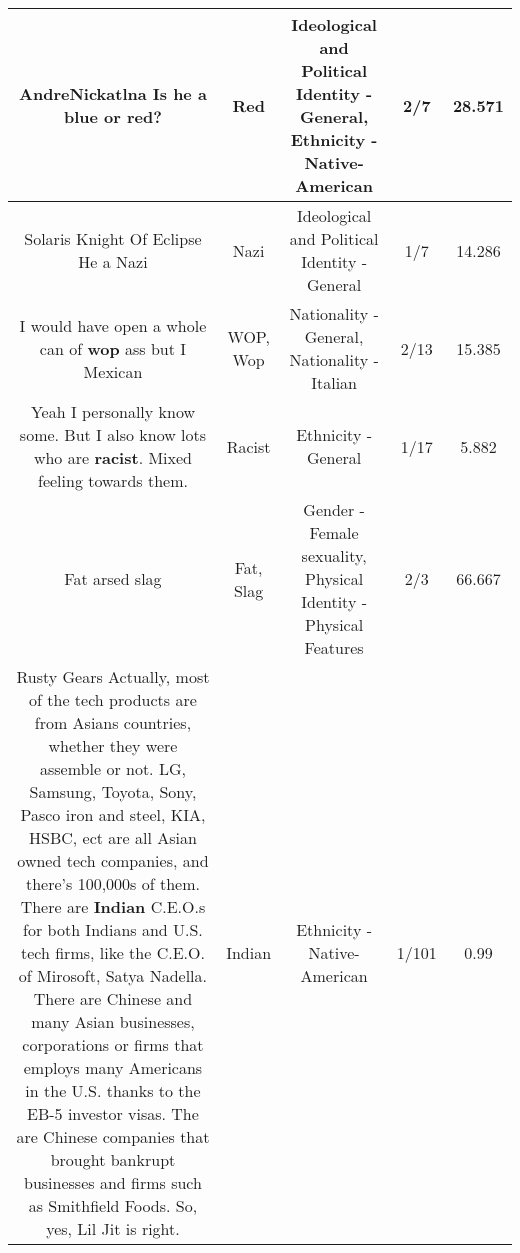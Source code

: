 \documentclass[11pt]{article}
\newlength\mylength
\begin{document}
\begin{center}
\begin{longtable}{|C{.65\mylength}|C{.30\mylength}|C{.12\mylength}|C{.12\mylength}|C{.12\mylength}|}
  \small AndreNickatlna Is he a blue or \textbf{r\textbf{ed}}?\normalsize   & Red &  Ideological and Political Identity - General, Ethnicity - Native-American & 2/7 & 28.571 \\  \hline
  \small Solaris Knight Of Eclipse He a Nazi\normalsize   & Nazi &  Ideological and Political Identity - General & 1/7 & 14.286 \\  \hline
  \small I would have open a whole can of \textbf{w\textbf{op}} ass but I Mexican\normalsize   & WOP, Wop & Nationality - General, Nationality - Italian & 2/13 & 15.385 \\  \hline
  \small Yeah I personally know some. But I also know lots who are \textbf{racist}. Mixed feeling towards them.\normalsize   & Racist & Ethnicity - General & 1/17 & 5.882 \\  \hline
  \small Fat arsed slag\normalsize   & Fat, Slag & Gender - Female sexuality, Physical Identity - Physical Features & 2/3 & 66.667 \\  \hline
  \small Rusty Gears Actually, most of the tech products are from Asians countries, whether they were assemble or not. LG, Samsung, Toyota, Sony, Pasco iron and steel, KIA, HSBC, ect are all Asian owned tech companies, and there's 100,000s of them. There are \textbf{Indian} C.E.O.s for both Indians and U.S. tech firms, like the C.E.O. of Mirosoft, Satya Nadella. There are Chinese and many Asian businesses, corporations or firms that employs many Americans in the U.S. thanks to the EB-5 investor visas. The are Chinese companies that brought bankrupt businesses and firms such as Smithfield Foods. So, yes, Lil Jit is right.\normalsize   & Indian & Ethnicity - Native-American & 1/101 & 0.99 \\  \hline

\end{longtable}
\end{center}
\end{document}

